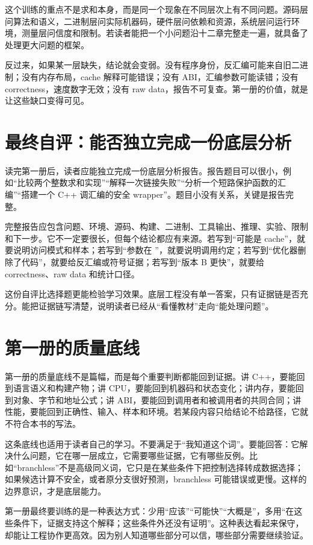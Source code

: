 这个训练的重点不是求和本身，而是同一个现象在不同层次上有不同问题。源码层问算法和语义，二进制层问实际机器码，硬件层问依赖和资源，系统层问运行环境，测量层问信度和限制。若读者能把一个小问题沿十二章完整走一遍，就具备了处理更大问题的框架。

反过来，如果某一层缺失，结论就会变弱。没有程序身份，反汇编可能来自旧二进制；没有内存布局，cache 解释可能错误；没有 ABI，汇编参数可能读错；没有 correctness，速度数字无效；没有 raw data，报告不可复查。第一册的价值，就是让这些缺口变得可见。

\section{最终自评：能否独立完成一份底层分析}

读完第一册后，读者应能独立完成一份底层分析报告。报告题目可以很小，例如“比较两个整数求和实现”“解释一次链接失败”“分析一个短路保护函数的汇编”“搭建一个 C++ 调汇编的安全 wrapper”。题目小没有关系，关键是报告完整。

完整报告应包含问题、环境、源码、构建、二进制、工具输出、推理、实验、限制和下一步。它不一定要很长，但每个结论都应有来源。若写到“可能是 cache”，就要说明访问模式和样本；若写到“参数在 ”，就要说明调用约定；若写到“优化器删除了代码”，就要给反汇编或符号证据；若写到“版本 B 更快”，就要给 correctness、raw data 和统计口径。

这份自评比选择题更能检验学习效果。底层工程没有单一答案，只有证据链是否充分。能把证据链写清楚，说明读者已经从“看懂教材”走向“能处理问题”。

\section{第一册的质量底线}

第一册的质量底线不是篇幅，而是每个重要判断都能回到证据。讲 C++，要能回到语言语义和构建产物；讲 CPU，要能回到机器码和状态变化；讲内存，要能回到对象、字节和地址公式；讲 ABI，要能回到调用者和被调用者的共同合同；讲性能，要能回到正确性、输入、样本和环境。若某段内容只给结论不给路径，它就不符合本书的写法。

这条底线也适用于读者自己的学习。不要满足于“我知道这个词”。要能回答：它解决什么问题，它在哪一层成立，它需要哪些证据，它有哪些反例。比如“branchless”不是高级同义词，它只是在某些条件下把控制选择转成数据选择；如果候选计算不安全，或者原分支很好预测，branchless 可能错误或更慢。这样的边界意识，才是底层能力。

第一册最终要训练的是一种表达方式：少用“应该”“可能快”“大概是”，多用“在这些条件下，证据支持这个解释；这些条件外还没有证明”。这种表达看起来保守，却能让工程协作更高效。因为别人知道哪些部分可以信，哪些部分需要继续验证。

